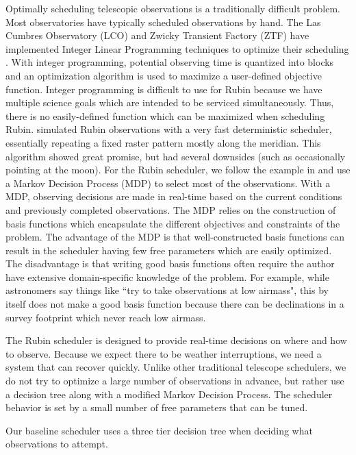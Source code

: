 Optimally scheduling telescopic observations is a traditionally difficult problem. Most observatories have typically scheduled observations by hand. The  Las Cumbres Observatory (LCO) and Zwicky Transient Factory (ZTF) have implemented Integer Linear Programming techniques to optimize their scheduling \citep{2015arXiv150307170L, 2019PASP..131f8003B}. With integer programming, potential observing time is quantized into blocks and an optimization algorithm is used to maximize a user-defined objective function.  Integer programming is difficult to use for Rubin because we have multiple science goals which are intended to be serviced simultaneously. Thus, there is no easily-defined function which can be maximized when scheduling Rubin. \citet{2019PASP..131k5002R} simulated Rubin observations with a very fast deterministic scheduler, essentially repeating a fixed raster pattern mostly along the meridian. This algorithm showed great promise, but had several downsides (such as occasionally pointing at the moon). For the Rubin scheduler, we follow the example in \citet{2019AJ....157..151N} and use a Markov Decision Process (MDP) to select most of the observations. With a MDP, observing decisions are made in real-time based on the current conditions and previously completed observations. The MDP relies on the construction of basis functions which encapsulate the different objectives and constraints of the problem.  The advantage of the MDP is that well-constructed basis functions can result in the scheduler having few free parameters which are easily optimized. The disadvantage is that writing good basis functions often require the author have extensive domain-specific knowledge of the problem.  For example, while astronomers say things like ``try to take observations at low airmass", this by itself does not make a good basis function because there can be declinations in a survey footprint which never reach low airmass. 

The Rubin scheduler is designed to provide real-time decisions on where and how to observe. Because we expect there to be weather interruptions, we need a system that can recover quickly. Unlike other traditional telescope schedulers, we do not try to optimize a large number of observations in advance, but rather use a decision tree along with a modified Markov Decision Process. The scheduler behavior is set by a small number of free parameters that can be tuned.

Our baseline scheduler uses a three tier decision tree when deciding what observations to attempt. 

